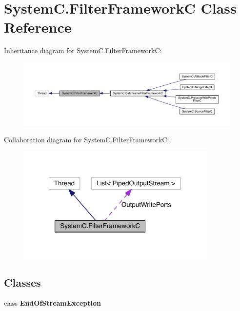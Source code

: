 \hypertarget{class_system_c_1_1_filter_framework_c}{}\section{System\+C.\+Filter\+Framework\+C Class Reference}
\label{class_system_c_1_1_filter_framework_c}


Inheritance diagram for System\+C.\+Filter\+Framework\+C\+:\nopagebreak
\begin{figure}[H]
\begin{center}
\leavevmode
\includegraphics[width=350pt]{class_system_c_1_1_filter_framework_c__inherit__graph}
\end{center}
\end{figure}


Collaboration diagram for System\+C.\+Filter\+Framework\+C\+:\nopagebreak
\begin{figure}[H]
\begin{center}
\leavevmode
\includegraphics[width=281pt]{class_system_c_1_1_filter_framework_c__coll__graph}
\end{center}
\end{figure}
\subsection*{Classes}
\begin{DoxyCompactItemize}
\item 
class {\bfseries End\+Of\+Stream\+Exception}
\end{DoxyCompactItemize}

